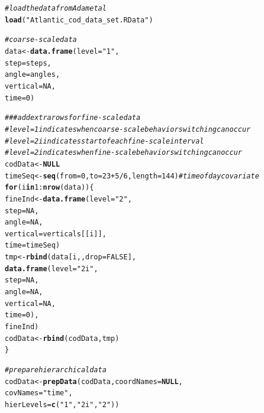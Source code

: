 \documentclass[12pt]{article}\usepackage[]{graphicx}\usepackage[]{xcolor}
\makeatletter
\newcommand{\hlnum}[1]{\textcolor[rgb]{0.686,0.059,0.569}{#1}}%
\newcommand{\hlsng}[1]{\textcolor[rgb]{0.192,0.494,0.8}{#1}}%
\newcommand{\hlcom}[1]{\textcolor[rgb]{0.678,0.584,0.686}{\textit{#1}}}%
\newcommand{\hlopt}[1]{\textcolor[rgb]{0,0,0}{#1}}%
\newcommand{\hldef}[1]{\textcolor[rgb]{0.345,0.345,0.345}{#1}}%
\newcommand{\hlkwa}[1]{\textcolor[rgb]{0.161,0.373,0.58}{\textbf{#1}}}%
\newcommand{\hlkwb}[1]{\textcolor[rgb]{0.69,0.353,0.396}{#1}}%
\newcommand{\hlkwc}[1]{\textcolor[rgb]{0.333,0.667,0.333}{#1}}%
\newcommand{\hlkwd}[1]{\textcolor[rgb]{0.737,0.353,0.396}{\textbf{#1}}}%
\newenvironment{kframe}{%
 \def\at@end@of@kframe{}%
 \ifinner\ifhmode%
  \def\at@end@of@kframe{\end{minipage}}%
  \begin{minipage}{\columnwidth}%
 \fi\fi%
 \def\FrameCommand##1{\hskip\@totalleftmargin \hskip-\fboxsep
 \colorbox{shadecolor}{##1}\hskip-\fboxsep
     \hskip-\linewidth \hskip-\@totalleftmargin \hskip\columnwidth}%
 \MakeFramed {\advance\hsize-\width
   \@totalleftmargin\z@ \linewidth\hsize
   \@setminipage}}%
 {\par\unskip\endMakeFramed%
 \at@end@of@kframe}
\newenvironment{knitrout}{}{} %
\makeatother
\begin{document}
\begin{knitrout}
\color{fgcolor}\begin{kframe}
\begin{alltt}
\hlcom{# load the data from Adam et al }
\hlkwd{load}\hldef{(}\hlsng{"Atlantic_cod_data_set.RData"}\hldef{)}

\hlcom{# coarse-scale data}
\hldef{data} \hlkwb{<-} \hlkwd{data.frame}\hldef{(}\hlkwc{level}\hldef{=}\hlsng{"1"}\hldef{,}
                   \hlkwc{step}\hldef{=steps,}
                   \hlkwc{angle}\hldef{=angles,}
                   \hlkwc{vertical}\hldef{=}\hlnum{NA}\hldef{,}
                   \hlkwc{time}\hldef{=}\hlnum{0}\hldef{)}

\hlcom{### add extra rows for fine-scale data}
\hlcom{# level=1  indicates when coarse-scale behavior switching can occur }
\hlcom{# level=2i indicates start of each fine-scale interval}
\hlcom{# level=2  indicates when fine-scale behavior switching can occur}
\hldef{codData} \hlkwb{<-} \hlkwa{NULL}
\hldef{timeSeq} \hlkwb{<-} \hlkwd{seq}\hldef{(}\hlkwc{from}\hldef{=}\hlnum{0}\hldef{,}\hlkwc{to}\hldef{=}\hlnum{23}\hlopt{+}\hlnum{5}\hlopt{/}\hlnum{6}\hldef{,}\hlkwc{length}\hldef{=}\hlnum{144}\hldef{)} \hlcom{# time of day covariate}
\hlkwa{for}\hldef{(i} \hlkwa{in} \hlnum{1}\hlopt{:}\hlkwd{nrow}\hldef{(data))\{}
  \hldef{fineInd} \hlkwb{<-} \hlkwd{data.frame}\hldef{(}\hlkwc{level}\hldef{=}\hlsng{"2"}\hldef{,}
                        \hlkwc{step}\hldef{=}\hlnum{NA}\hldef{,}
                        \hlkwc{angle}\hldef{=}\hlnum{NA}\hldef{,}
                        \hlkwc{vertical}\hldef{=verticals[[i]],}
                        \hlkwc{time}\hldef{=timeSeq)}
  \hldef{tmp} \hlkwb{<-} \hlkwd{rbind}\hldef{(data[i,,}\hlkwc{drop}\hldef{=}\hlnum{FALSE}\hldef{],}
               \hlkwd{data.frame}\hldef{(}\hlkwc{level}\hldef{=}\hlsng{"2i"}\hldef{,}
                          \hlkwc{step}\hldef{=}\hlnum{NA}\hldef{,}
                          \hlkwc{angle}\hldef{=}\hlnum{NA}\hldef{,}
                          \hlkwc{vertical}\hldef{=}\hlnum{NA}\hldef{,}
                          \hlkwc{time}\hldef{=}\hlnum{0}\hldef{),}
               \hldef{fineInd)}
  \hldef{codData} \hlkwb{<-} \hlkwd{rbind}\hldef{(codData,tmp)}
\hldef{\}}

\hlcom{# prepare hierarchical data}
\hldef{codData} \hlkwb{<-} \hlkwd{prepData}\hldef{(codData,} \hlkwc{coordNames}\hldef{=}\hlkwa{NULL}\hldef{,}
                    \hlkwc{covNames}\hldef{=}\hlsng{"time"}\hldef{,}
                    \hlkwc{hierLevels}\hldef{=}\hlkwd{c}\hldef{(}\hlsng{"1"}\hldef{,}\hlsng{"2i"}\hldef{,}\hlsng{"2"}\hldef{))}
\end{alltt}
\end{kframe}
\end{knitrout}
\end{document}
